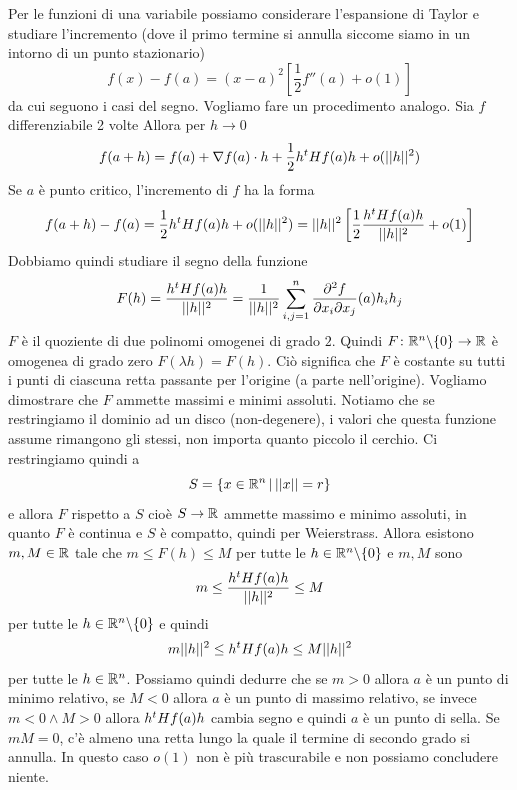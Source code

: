 \documentclass[a4paper]{article}
\begin{document}
\begin{radioactive}
Per le funzioni di una variabile possiamo considerare l'espansione di Taylor
e studiare l'incremento (dove il primo termine si annulla siccome siamo in un intorno di un punto stazionario)
\[
    f(x) - f(a) = {(x-a)}^2 \left[
        \frac{1}{2}f''(a) + o(1)
    \right]
\]
da cui seguono i casi del segno.
Vogliamo fare un procedimento analogo.
Sia \(f\) differenziabile 2 volte
Allora per \(h \to 0\)
\begin{align*}
    f(a + h) = f(a) + \nabla f(a) \cdot h + \frac{1}{2}h^t H f(a)h + o(||h||^2)
\end{align*}
Se \(a\) è punto critico, l'incremento di \(f\) ha la forma
\[
    f(a + h) - f(a) = \frac{1}{2}h^t H f(a)h + o(||h||^2)
    = ||h||^2 \left[
        \frac{1}{2}\frac{h^tH f(a)h}{||h||^2} + o(1)
    \right]
\]
Dobbiamo quindi studiare il segno della funzione
\[
    F(h) = \frac{h^t H f(a)h}{||h||^2}
    = \frac{1}{||h||^2} \sum_{i,j = 1}^n \frac{\partial^2 f}{\partial x_i \partial x_j}(a)h_i h_j
\]
\(F\) è il quoziente di due polinomi omogenei di grado \(2\).
Quindi \(F\colon \mathbb{R}^n \backslash \{0\} \to \mathbb{R}\) è omogenea di grado zero \(F(\lambda h) = F(h)\).
Ciò significa che \(F\) è costante su tutti i punti
di ciascuna retta passante per l'origine (a parte nell'origine).
Vogliamo dimostrare che \(F\) ammette massimi e minimi assoluti.
Notiamo che se restringiamo il dominio ad un disco (non-degenere),
i valori che questa funzione assume rimangono gli stessi, non importa quanto piccolo
il cerchio.
Ci restringiamo quindi a \[
    S = \{x \in \mathbb{R}^n \,|\, ||x|| = r\}
\]
e allora \(F\) rispetto a \(S\) cioè \(S \to \mathbb{R}\)
ammette massimo e minimo assoluti,
in quanto \(F\) è continua e \(S\) è compatto,
quindi per Weierstrass.
Allora esistono \(m, M \in \mathbb{R}\)
tale che \(m \leq F(h) \leq M\) per tutte le \(h \in \mathbb{R}^n \backslash \{0\}\)
e \(m, M\) sono
\[
    m \leq \frac{h^t H f(a)h}{||h||^2} \leq M
\]
per tutte le \(h \in \mathbb{R}^n \backslash \{0\}\)
e quindi
\[
    m||h||^2 \leq h^tH f(a)h \leq M||h||^2
\]
per tutte le \(h \in \mathbb{R}^n\).
Possiamo quindi dedurre che se \(m > 0\) allora \(a\) è un punto
di minimo relativo, se \(M < 0\) allora \(a\) è un punto di massimo relativo,
se invece \(m < 0 \land M > 0\) allora \(h^tH f(a)h\)
cambia segno e quindi \(a\) è un punto di sella.
Se \(mM=0\), c'è almeno una retta lungo la quale il termine di secondo grado si annulla.
In questo caso \(o(1)\) non è più trascurabile e non possiamo concludere niente.
\end{radioactive}
\end{document}
